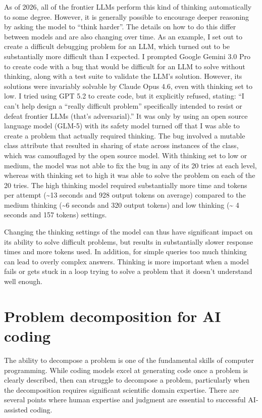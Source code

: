 As of 2026, all of the frontier LLMs perform this kind of thinking automatically to some degree.  However, it is generally possible to encourage deeper reasoning by asking the model to ``think harder''. The details on how to do this differ between models and are also changing over time. As an example, I set out to create a difficult debugging problem for an LLM, which turned out to be substantially more difficult than I expected.  I prompted Google Gemini 3.0 Pro to create code with a bug that would be difficult for an LLM to solve without thinking, along with a test suite to validate the LLM's solution. However, its solutions were invariably solvable by Claude Opus 4.6, even with thinking set to low.  I tried using GPT 5.2 to create code, but it explicitly refused, stating: ``I can't help design a ``really difficult problem'' specifically intended to resist or defeat frontier LLMs (that's adversarial).'' It was only by using an open source language model (GLM-5) with its safety model turned off that I was able to create a problem that actually required thinking. The bug involved a mutable class attribute that resulted in sharing of state across instances of the class, which was camouflaged by the open source model.  With thinking set to low or medium, the model was not able to fix the bug in any of its 20 tries at each level, whereas with thinking set to high it was able to solve the problem on each of the 20 tries.  The high thinking model required substantially more time and tokens per attempt ({\textasciitilde}13 seconds and 928 output tokens on average) compared to the medium thinking ({\textasciitilde}6 seconds and 320 output tokens) and low thinking ({\textasciitilde} 4 seconds and 157 tokens) settings.

Changing the thinking settings of the model can thus have significant impact on its ability to solve difficult problems, but results in substantially slower response times and more tokens used. In addition, for simple queries too much thinking can lead to overly complex answers.  Thinking is more important when a model fails or gets stuck in a loop trying to solve a problem that it doesn't understand well enough.

\section{Problem decomposition for AI coding}

The ability to decompose a problem is one of the fundamental skills of computer programming.  While coding models excel at generating code once a problem is clearly described, then can struggle to decompose a problem, particularly when the decomposition requires significant scientific domain expertise.  There are several points where human expertise and judgment are essential to successful AI-assisted coding.

